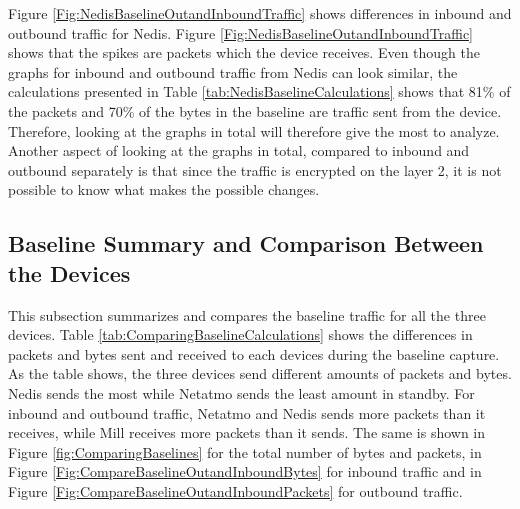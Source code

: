 Figure \ref{Fig:NedisBaselineOutandInboundTraffic} shows differences in inbound and outbound traffic for Nedis. Figure \ref{Fig:NedisBaselineOutandInboundTraffic} shows that the spikes are packets which the device receives. Even though the graphs for inbound and outbound traffic from Nedis can look similar, the calculations presented in Table \ref{tab:NedisBaselineCalculations} shows that 81\% of the packets and 70\% of the bytes in the baseline are traffic sent from the device. Therefore, looking at the graphs in total will therefore give the most to analyze. Another aspect of looking at the graphs in total, compared to inbound and outbound separately is that since the traffic is encrypted on the layer 2, it is not possible to know what makes the possible changes. 

\subsection{Baseline Summary and Comparison Between the Devices}
This subsection summarizes and compares the baseline traffic for all the three devices. Table \ref{tab:ComparingBaselineCalculations} shows the differences in packets and bytes sent and received to each devices during the baseline capture. As the table shows, the three devices send different amounts of packets and bytes. Nedis sends the most while Netatmo sends the least amount in standby. For inbound and outbound traffic, Netatmo and Nedis sends more packets than it receives, while Mill receives more packets than it sends. The same is shown in Figure \ref{fig:ComparingBaselines} for the total number of bytes and packets, in Figure \ref{Fig:CompareBaselineOutandInboundBytes} for inbound traffic and in Figure \ref{Fig:CompareBaselineOutandInboundPackets} for outbound traffic.

